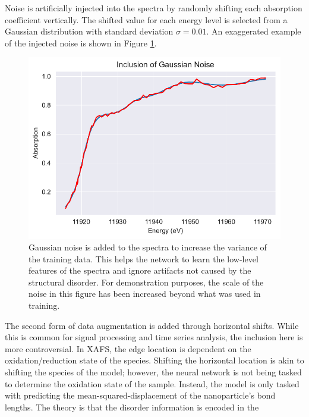 Noise is artificially injected into the spectra by randomly shifting each absorption coefficient vertically. The shifted value for each energy level is selected from a Gaussian distribution with standard deviation $ \sigma=0.01 $. An exaggerated example of the injected noise is shown in Figure \ref{fig:data-aug-gauss-noise}.

\begin{figure}
    \centering
    \includegraphics[width=\linewidth]{Chapters/Figures/gaussian-noise-data-aug.pdf}
    \caption[Data Augmentation: Gaussian Noise]{Gaussian noise is added to the spectra to increase the variance of the training data. This helps the network to learn the low-level features of the spectra and ignore artifacts not caused by the structural disorder. For demonstration purposes, the scale of the noise in this figure has been increased beyond what was used in training.}
    \label{fig:data-aug-gauss-noise}
\end{figure}

The second form of data augmentation is added through horizontal shifts. While this is common for signal processing and time series analysis, the inclusion here is more controversial. In XAFS, the edge location is dependent on the oxidation/reduction state of the species. Shifting the horizontal location is akin to shifting the species of the model; however, the neural network is not being tasked to determine the oxidation state of the sample. Instead, the model is only tasked with predicting the mean-squared-displacement of the nanoparticle's bond lengths. The theory is that the disorder information is encoded in the  


